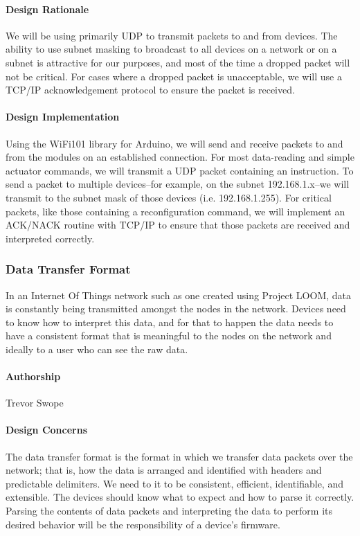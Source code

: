 \documentclass[onecolumn, draftclsnofoot,10pt, compsoc]{IEEEtran}
\begin{document}
\paragraph{Design Rationale}
    We will be using primarily UDP to transmit packets to and from devices. The ability to use subnet masking to broadcast to all devices on a network or on a subnet is attractive for our purposes, and most of the time a dropped packet will not be critical. For cases where a dropped packet is unacceptable, we will use a TCP/IP acknowledgement protocol to ensure the packet is received.

\paragraph{Design Implementation}
    Using the WiFi101 library for Arduino, we will send and receive packets to and from the modules on an established connection. For most data-reading and simple actuator commands, we will transmit a UDP packet containing an instruction. To send a packet to multiple devices--for example, on the subnet 192.168.1.x--we will transmit to the subnet mask of those devices (i.e. 192.168.1.255). For critical packets, like those containing a reconfiguration command, we will implement an ACK/NACK routine with TCP/IP to ensure that those packets are received and interpreted correctly.


\subsubsection{Data Transfer Format}
    In an Internet Of Things network such as one created using Project LOOM, data is constantly being transmitted amongst the nodes in the network. Devices need to know how to interpret this data, and for that to happen the data needs to have a consistent format that is meaningful to the nodes on the network and ideally to a user who can see the raw data.

\paragraph{Authorship}
    Trevor Swope

\paragraph{Design Concerns}
    The data transfer format is the format in which we transfer data packets over the network; that is, how the data is  arranged and identified with headers and predictable delimiters. We need to it to be consistent, efficient, identifiable, and extensible. The devices should know what to expect and how to parse it correctly. Parsing the contents of data packets and interpreting the data to perform its desired behavior will be the responsibility of a device's firmware. 
\end{document}
